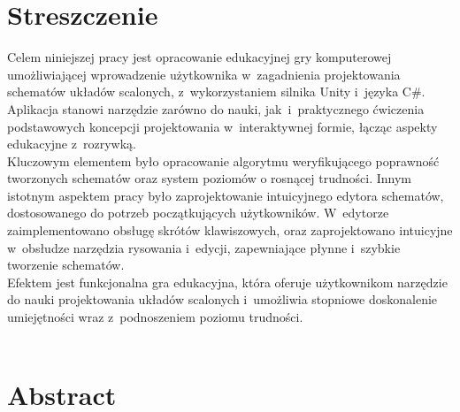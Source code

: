 \section*{Streszczenie}
\label{sec:streszczenie}
\thispagestyle{plain}
Celem niniejszej pracy jest opracowanie edukacyjnej gry komputerowej umożliwiającej wprowadzenie użytkownika
w~zagadnienia projektowania schematów układów scalonych,
z~wykorzystaniem silnika Unity i~języka C\#.
Aplikacja stanowi narzędzie zarówno do nauki,
jak~i~praktycznego ćwiczenia podstawowych koncepcji projektowania w~interaktywnej formie,
łącząc aspekty edukacyjne z~rozrywką.\\
\indent %
Kluczowym elementem było opracowanie algorytmu weryfikującego
poprawność tworzonych schematów oraz system poziomów o rosnącej trudności.
Innym istotnym aspektem pracy było zaprojektowanie intuicyjnego edytora schema\-tów,
dostosowanego do potrzeb początkujących użytkowników.
W~edytorze zaimplementowano obsługę skrótów klawiszowych, oraz zaprojektowano intuicyjne w~obsłudze narzę\-dzia rysowania i~edycji,
zapewniające płynne i~szybkie tworzenie schematów.\\
\indent Efektem jest funkcjonalna gra edukacyjna,
która oferuje użytkownikom narzę\-dzie do nauki projektowania układów scalonych
i~umożliwia stopniowe doskonalenie umiejętności wraz z~podnoszeniem poziomu trudności.\\
\\


\section*{Abstract}
\label{sec:abstract}

